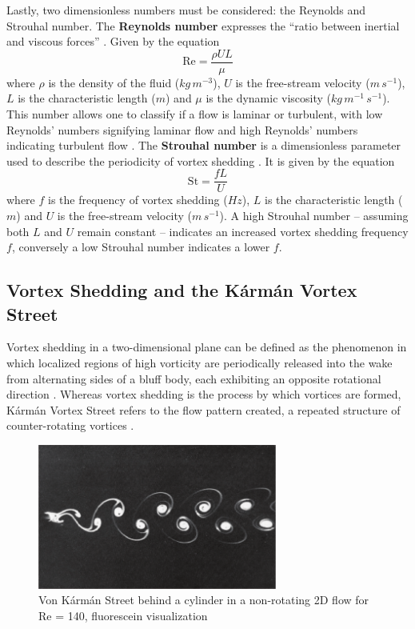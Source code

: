 Lastly, two dimensionless numbers must be considered: the Reynolds and Strouhal number. The \textbf{Reynolds number} expresses the “ratio between inertial and viscous forces” \parencite{nasa_reynolds}. Given by the equation 
\[
\mathrm{Re} = \frac{\rho U L}{\mu}
\]
where $\rho$ is the density of the fluid ($kg\,m^{-3}$), $U$ is the free-stream velocity ($m\,s^{-1}$), $L$ is the characteristic length ($m$) and $\mu$ is the dynamic viscosity ($kg\,m^{-1}\,s^{-1}$). This number allows one to classify if a flow is laminar or turbulent, with low Reynolds’ numbers signifying laminar flow and high Reynolds’ numbers indicating turbulent flow \parencite{saldana2024_reynolds}. The \textbf{Strouhal number} is a dimensionless parameter used to describe the periodicity of vortex shedding \parencite[p.~211]{choi2000strouhal}. It is given by the equation 
\[
\mathrm{St} = \frac{f L}{U}
\]
where $f$ is the frequency of vortex shedding ($Hz$), $L$ is the characteristic length ($m$) and $U$ is the free-stream velocity  ($m\,s^{-1}$). A high Strouhal number -- assuming both $L$ and $U$ remain constant -- indicates an increased vortex shedding frequency $f$, conversely a low Strouhal number indicates a lower $f$.


\subsection{Vortex Shedding and the Kármán Vortex Street}
Vortex shedding in a two-dimensional plane can be defined as the phenomenon in which localized regions of high vorticity are periodically released into the wake from alternating sides of a bluff body, each exhibiting an opposite rotational direction \parencite[156]{green1995fluid}. Whereas vortex shedding is the process by which vortices are formed, Kármán Vortex Street refers to the flow pattern created, a repeated structure of counter-rotating vortices \parencite[26]{govardhan2005karman}.

\begin{figure}[htbp]
	\centering
	\includegraphics[width=0.7\textwidth]{images/vonKarmanStreet.png}
	\caption{Von Kármán Street behind a cylinder in a non-rotating 2D flow for Re = 140, fluorescein visualization \parencite[144]{ilieva2017turbulence}}
	\label{fig:vonKarmanStreet}
\end{figure}
